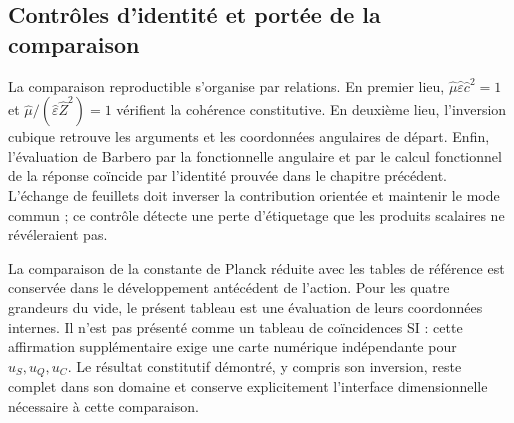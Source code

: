 \subsection{Contrôles d’identité et portée de la comparaison}

La comparaison reproductible s’organise par relations. En premier lieu,
$\widehat\mu\widehat\varepsilon\widehat c^2=1$ et
$\widehat\mu/(\widehat\varepsilon\widehat Z^2)=1$ vérifient la
cohérence constitutive. En deuxième lieu, l’inversion cubique retrouve
les arguments et les coordonnées angulaires de départ. Enfin,
l’évaluation de Barbero par la fonctionnelle angulaire et par le calcul fonctionnel
de la réponse coïncide par l’identité prouvée dans le chapitre précédent.
L’échange de feuillets doit inverser la contribution orientée et maintenir
le mode commun ; ce contrôle détecte une perte d’étiquetage que les
produits scalaires ne révéleraient pas.

La comparaison de la constante de Planck réduite avec les tables de
référence est conservée dans le développement antécédent de l’action. Pour les
quatre grandeurs du vide, le présent tableau est une évaluation de leurs
coordonnées internes. Il n’est pas présenté comme un tableau de coïncidences SI :
cette affirmation supplémentaire exige une carte numérique indépendante pour
$u_S,u_Q,u_C$. Le résultat constitutif démontré, y compris son inversion,
reste complet dans son domaine et conserve explicitement l’interface
dimensionnelle nécessaire à cette comparaison.
